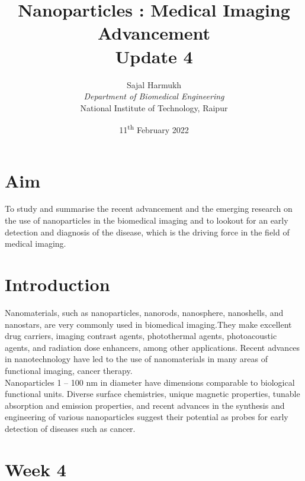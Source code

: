 \documentclass{article}
\title{\textbf{Nanoparticles : Medical Imaging Advancement\\Update 4}}
\author{Sajal Harmukh \\ \textit{Department of Biomedical Engineering} \\ National Institute of Technology, Raipur }
\date{11\textsuperscript{th} February 2022}
\begin{document}
\maketitle

\section*{Aim}
\large
To study and summarise the recent advancement and the emerging research on the use of nanoparticles in the biomedical imaging and to lookout for an early detection and diagnosis of the disease, which is the driving force in the field of medical imaging.

\section*{Introduction}
Nanomaterials, such as nanoparticles, nanorods, nanosphere, nanoshells, and nanostars, are
very commonly used in biomedical imaging.They make excellent drug carriers, imaging contrast agents, photothermal agents, photoacoustic agents, and radiation dose enhancers, among other applications. Recent advances in nanotechnology have led to the use of nanomaterials
in many areas of functional imaging, cancer therapy.\\ Nanoparticles 1 – 100 nm in diameter have dimensions comparable to biological functional units. Diverse surface chemistries, unique magnetic properties, tunable absorption and emission properties, and recent advances in the synthesis and engineering of various nanoparticles suggest their potential as probes for early detection of diseases such as cancer.
 


\section*{Week 4 }
\end{document}

